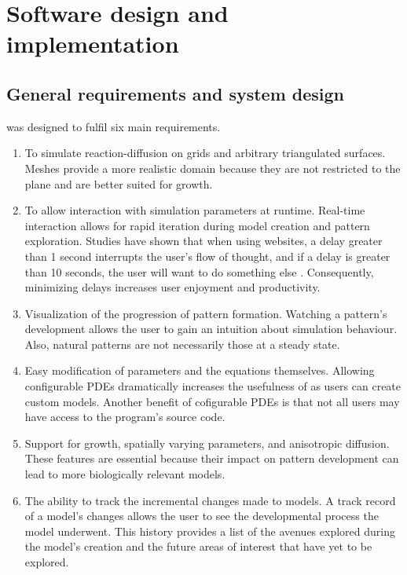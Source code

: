 \chapter{Software design and  implementation}

\section{General requirements and system design}
\ProgramName{} was designed to fulfil six main requirements.

\begin{enumerate}
	\item To simulate reaction-diffusion on grids and arbitrary triangulated surfaces. Meshes provide a more realistic domain because they are not restricted to the plane and are better suited for growth. 
	
	\item To allow interaction with simulation parameters at runtime. Real-time interaction allows for rapid iteration during model creation and pattern exploration. Studies have shown that when using websites, a delay greater than 1 second interrupts the user's flow of thought, and if a delay is greater than 10 seconds, the user will want to do something else \citep{nielsen1994}. Consequently, minimizing delays increases user enjoyment and productivity. 

	\item Visualization of the progression of pattern formation. Watching a pattern's development allows the user to gain an intuition about simulation behaviour. Also, natural patterns are not necessarily those at a steady state.
	
	\item Easy modification of parameters and the equations themselves. Allowing configurable PDEs dramatically increases the usefulness of \ProgramName{} as users can create custom models. Another benefit of cofigurable PDEs is that not all users may have access to the program's source code. 
		
	\item Support for growth, spatially varying parameters, and anisotropic diffusion. These features are essential because their impact on pattern development can lead to more biologically relevant models. 
	
	\item The ability to track the incremental changes made to models. A track record of a model's changes allows the user to see the developmental process the model underwent. This history provides a list of the avenues explored during the model's creation and the future areas of interest that have yet to be explored.
	
\end{enumerate}

